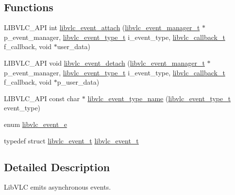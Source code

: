 \subsection*{Functions}
\begin{DoxyCompactItemize}
\item 
L\+I\+B\+V\+L\+C\+\_\+\+A\+PI int \hyperlink{group__libvlc__event_gaed9956a22efad4f466ffd4ec8ab45926}{libvlc\+\_\+event\+\_\+attach} (\hyperlink{group__libvlc__event_gaa82f247503d3558b9117550e8d3c9259}{libvlc\+\_\+event\+\_\+manager\+\_\+t} $\ast$p\+\_\+event\+\_\+manager, \hyperlink{group__libvlc__event_ga88990ac48895aa07caece9eb75c2f2da}{libvlc\+\_\+event\+\_\+type\+\_\+t} i\+\_\+event\+\_\+type, \hyperlink{group__libvlc__event_gafb4d63849005e4dce5b2180a40144fe4}{libvlc\+\_\+callback\+\_\+t} f\+\_\+callback, void $\ast$user\+\_\+data)
\item 
L\+I\+B\+V\+L\+C\+\_\+\+A\+PI void \hyperlink{group__libvlc__event_ga25b19849dc46d9a57be6815920a17e16}{libvlc\+\_\+event\+\_\+detach} (\hyperlink{group__libvlc__event_gaa82f247503d3558b9117550e8d3c9259}{libvlc\+\_\+event\+\_\+manager\+\_\+t} $\ast$p\+\_\+event\+\_\+manager, \hyperlink{group__libvlc__event_ga88990ac48895aa07caece9eb75c2f2da}{libvlc\+\_\+event\+\_\+type\+\_\+t} i\+\_\+event\+\_\+type, \hyperlink{group__libvlc__event_gafb4d63849005e4dce5b2180a40144fe4}{libvlc\+\_\+callback\+\_\+t} f\+\_\+callback, void $\ast$p\+\_\+user\+\_\+data)
\item 
L\+I\+B\+V\+L\+C\+\_\+\+A\+PI const char $\ast$ \hyperlink{group__libvlc__event_gaaea649874b9a9cff0b05dd5554e00318}{libvlc\+\_\+event\+\_\+type\+\_\+name} (\hyperlink{group__libvlc__event_ga88990ac48895aa07caece9eb75c2f2da}{libvlc\+\_\+event\+\_\+type\+\_\+t} event\+\_\+type)
\end{DoxyCompactItemize}
\begin{DoxyCompactItemize}
\item 
enum \hyperlink{group__libvlc__event_ga284c010ecde8abca7d3f262392f62fc6}{libvlc\+\_\+event\+\_\+e} 
\item 
typedef struct \hyperlink{structlibvlc__event__t}{libvlc\+\_\+event\+\_\+t} \hyperlink{group__libvlc__event_gafaddfc5a26310923408a08290bea1dab}{libvlc\+\_\+event\+\_\+t}
\end{DoxyCompactItemize}


\subsection{Detailed Description}
Lib\+V\+LC emits asynchronous events.

